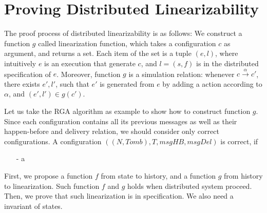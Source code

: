 
\section{Proving Distributed Linearizability}
\label{sec:proving distributed linearizability} 

The proof process of distributed linearizability is as follows: We construct a function $g$ called linearization function, which takes a configuration $c$ as argument, and returns a set. Each item of the set is a tuple $(e,l)$, where intuitively $e$ is an execution that generate $c$, and $l = (s,f)$ is in the distributed specification of $e$. Moreover, function $g$ is a simulation relation: whenever $c {\xrightarrow{\alpha}} c'$, there exists $e',l'$, such that $e'$ is generated from $e$ by adding a action according to $\alpha$, and $(e',l') \in g(c')$.

Let us take the RGA algorithm as example to show how to construct function $g$. Since each configuration contains all its previous messages as well as their happen-before and delivery relation, we should consider only correct configurations. A configuration $((N,\mathit{Tomb}),T,\mathit{msgHB},\mathit{msgDel})$ is correct, if 

\begin{itemize}
\setlength{\itemsep}{0.5pt}
\item[-] a
\end{itemize}



First, we propose a function $f$ from state to history, and a function $g$ from history to linearization. Such function $f$ and $g$ holds when distributed system proceed. Then, we prove that such linearization is in specification. We also need a invariant of states.




